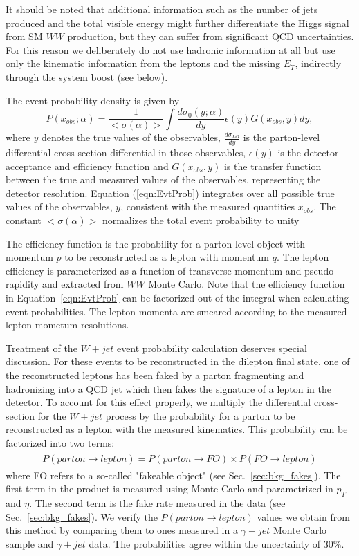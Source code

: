 It should be noted that additional information such as the number of jets
produced and the total visible energy might further differentiate the Higgs signal from SM
$WW$ production,
but they can suffer from significant  QCD uncertainties. For this reason we 
deliberately do not use hadronic information at all but use
only the kinematic information from the leptons and the missing $E_T$, indirectly
through the system boost (see below).

The event probability density is given by
\begin{equation}
P(x_{obs};\alpha) =
 \frac{1}{ < \sigma(\alpha) > }
 \int \frac {d \sigma_{0} (y;\alpha) }{ dy }
 \epsilon (y) G(x_{obs},y) dy,  
\label{eqn:EvtProb}  
\end{equation}
where $y$ denotes the true values of the observables,
$\frac{d \sigma_{LO}}{dy}$ is the  parton-level differential cross-section differential
in those observables, $\epsilon(y)$ is the detector acceptance and efficiency function
and $G(x_{obs},y)$ is the transfer function between the true and measured values of the
observables, representing the detector resolution.
Equation (\ref{eqn:EvtProb}) integrates over all possible true values of the
observables, $y$, consistent with the measured quantities $x_{obs}$.
The constant $<\sigma(\alpha)>$ normalizes the total event probability to unity

The efficiency function is the probability for a parton-level object with momentum 
$p$ to be reconstructed as a lepton with momentum $q$. The lepton efficiency is parameterized 
as a function of transverse momentum and pseudo-rapidity and extracted from $WW$ Monte Carlo. 
Note that the efficiency function in Equation~\ref{eqn:EvtProb} can be factorized out of
the integral when calculating event probabilities.
The lepton momenta are smeared according to the measured lepton mometum resolutions. 

Treatment of the $W+jet$ event probability calculation deserves special discussion.
For these events to be reconstructed in the dilepton final state,
one of the reconstructed leptons has been faked by a parton fragmenting and hadronizing 
into a QCD jet which then fakes the signature of a lepton in the detector. To account for this 
effect properly, we multiply the differential cross-section for the $W+jet$ process by the 
probability for a parton to be reconstructed as a lepton with the measured kinematics. 
This probability can be factorized into two terms:
\begin{eqnarray}
\begin{array}{lcl}
P(parton\rightarrow lepton)=P(parton\rightarrow FO)\times P(FO\rightarrow lepton)
\end{array} 
\end{eqnarray} 
where FO refers to a so-called "fakeable object" (see Sec.~\ref{sec:bkg_fakes}). 
The first term in the product is measured using Monte Carlo and parametrized
in $p_{T}$ and $\eta$.  The second term is the fake rate measured in the data 
(see Sec.~\ref{sec:bkg_fakes}).
We verify the $P(parton\rightarrow lepton)$ values we obtain from this method by 
comparing them to ones measured in a $\gamma+jet$ Monte Carlo sample and $\gamma+jet$ data.
The probabilities agree within the uncertainty of $30\%$.  

